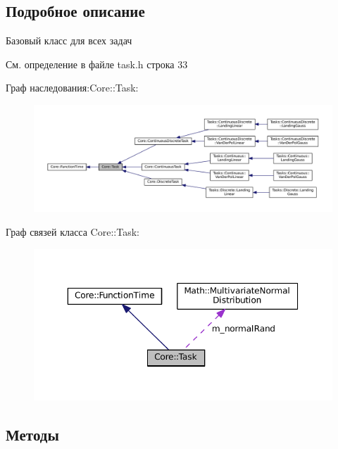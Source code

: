 \subsection{Подробное описание}
Базовый класс для всех задач 

См. определение в файле task.\+h строка 33



Граф наследования\+:Core\+:\+:Task\+:
\nopagebreak
\begin{figure}[H]
\begin{center}
\leavevmode
\includegraphics[width=350pt]{class_core_1_1_task__inherit__graph}
\end{center}
\end{figure}


Граф связей класса Core\+:\+:Task\+:
\nopagebreak
\begin{figure}[H]
\begin{center}
\leavevmode
\includegraphics[width=350pt]{class_core_1_1_task__coll__graph}
\end{center}
\end{figure}


\subsection{Методы}
\hypertarget{class_core_1_1_task_ac8b451d78816e62347954452b7ace250}{}\label{class_core_1_1_task_ac8b451d78816e62347954452b7ace250} 
